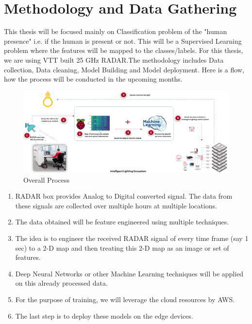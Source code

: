 \chapter{Methodology and Data Gathering}
\label{chapter:methodology}
This thesis will be focused mainly on Classification problem of the "human presence" i.e. if the human is present or not. This will be a Supervised Learning problem where the features will be mapped to the classes/labels.
For this thesis, we are using VTT built 25 GHz RADAR.The methodology includes Data collection, Data cleaning, Model Building and Model deployment. Here is a flow, how the process will be conducted in the upcoming months.


\begin{figure}[ht]
  \begin{center}
    \includegraphics[width=1\textwidth]{Master's thesis/images/thesis_presentation.png} 
    \caption{Overall Process}
    \label{fig:basic_principle}
  \end{center}
\end{figure}


\begin{enumerate}
    \item RADAR box provides Analog to Digital converted signal. The data from these signals are collected over multiple hours at multiple locations.
    \item The data obtained will be feature engineered using multiple techniques.
    \item The idea is to engineer the received RADAR signal of every time frame (say 1 sec) to a 2-D map and then treating this 2-D map as an image or set of features.
    \item Deep Neural Networks or other Machine Learning techniques will be applied on this already processed data.
    \item For the purpose of training, we will leverage the cloud resources by AWS.
    \item The last step is to deploy these models on the edge devices.
\end{enumerate}

